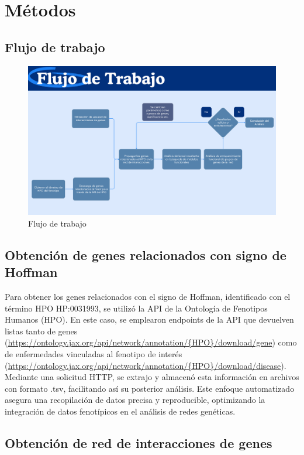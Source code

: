 \section{Métodos}

\subsection{Flujo de trabajo}

\begin{figure}[h!]
	\includegraphics[width=.95\textwidth]{figures/workflow.png}
	\caption{Flujo de trabajo}
	\label{fig:workflow}
\end{figure}

\subsection{Obtención de genes relacionados con signo de Hoffman}

Para obtener los genes relacionados con el signo de Hoffman, identificado con el término HPO HP:0031993, se utilizó la API de la Ontología de Fenotipos Humanos (HPO). En este caso, se emplearon endpoints de la API que devuelven listas tanto de genes (\url{https://ontology.jax.org/api/network/annotation/{HPO}/download/gene}) como de enfermedades vinculadas al fenotipo de interés (\url{https://ontology.jax.org/api/network/annotation/{HPO}/download/disease}). Mediante una solicitud HTTP, se extrajo y almacenó esta información en archivos con formato .tsv, facilitando así su posterior análisis. Este enfoque automatizado asegura una recopilación de datos precisa y reproducible, optimizando la integración de datos fenotípicos en el análisis de redes genéticas.



\subsection{Obtención de red de interacciones de genes}


